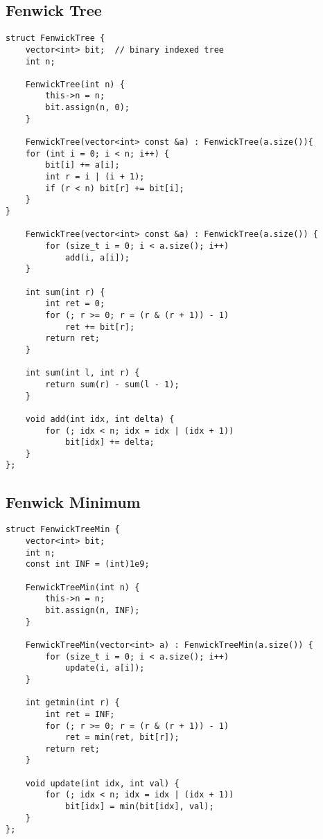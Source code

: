 \documentclass[10pt]{article}
\begin{document}
\begin{multicols*}{2}
\subsection{Fenwick Tree}
\begin{lstlisting}[style=compactcpp]
struct FenwickTree {
    vector<int> bit;  // binary indexed tree
    int n;

    FenwickTree(int n) {
        this->n = n;
        bit.assign(n, 0);
    }

    FenwickTree(vector<int> const &a) : FenwickTree(a.size()){
    for (int i = 0; i < n; i++) {
        bit[i] += a[i];
        int r = i | (i + 1);
        if (r < n) bit[r] += bit[i];
    }
}

    FenwickTree(vector<int> const &a) : FenwickTree(a.size()) {
        for (size_t i = 0; i < a.size(); i++)
            add(i, a[i]);
    }

    int sum(int r) {
        int ret = 0;
        for (; r >= 0; r = (r & (r + 1)) - 1)
            ret += bit[r];
        return ret;
    }

    int sum(int l, int r) {
        return sum(r) - sum(l - 1);
    }

    void add(int idx, int delta) {
        for (; idx < n; idx = idx | (idx + 1))
            bit[idx] += delta;
    }
};
\end{lstlisting}

\subsection{Fenwick Minimum}

\begin{lstlisting}[style=compactcpp]
struct FenwickTreeMin {
    vector<int> bit;
    int n;
    const int INF = (int)1e9;

    FenwickTreeMin(int n) {
        this->n = n;
        bit.assign(n, INF);
    }

    FenwickTreeMin(vector<int> a) : FenwickTreeMin(a.size()) {
        for (size_t i = 0; i < a.size(); i++)
            update(i, a[i]);
    }

    int getmin(int r) {
        int ret = INF;
        for (; r >= 0; r = (r & (r + 1)) - 1)
            ret = min(ret, bit[r]);
        return ret;
    }

    void update(int idx, int val) {
        for (; idx < n; idx = idx | (idx + 1))
            bit[idx] = min(bit[idx], val);
    }
};
\end{lstlisting}


\end{multicols*}
\end{document}
